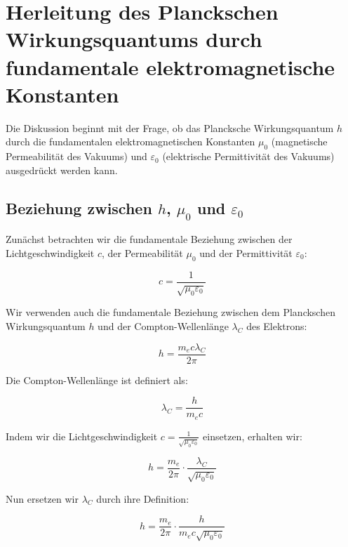 \documentclass{article}
\begin{document}
	\section{Herleitung des Planckschen Wirkungsquantums durch fundamentale elektromagnetische Konstanten}
	
	Die Diskussion beginnt mit der Frage, ob das Plancksche Wirkungsquantum $h$ durch die fundamentalen elektromagnetischen Konstanten $\mu_0$ (magnetische Permeabilität des Vakuums) und $\varepsilon_0$ (elektrische Permittivität des Vakuums) ausgedrückt werden kann.
	
	\subsection{Beziehung zwischen $h$, $\mu_0$ und $\varepsilon_0$}
	
	Zunächst betrachten wir die fundamentale Beziehung zwischen der Lichtgeschwindigkeit $c$, der Permeabilität $\mu_0$ und der Permittivität $\varepsilon_0$:
	
	\begin{equation}
		c = \frac{1}{\sqrt{\mu_0\varepsilon_0}}
	\end{equation}
	
	Wir verwenden auch die fundamentale Beziehung zwischen dem Planckschen Wirkungsquantum $h$ und der Compton-Wellenlänge $\lambda_C$ des Elektrons:
	
	\begin{equation}
		h = \frac{m_e c \lambda_C}{2\pi}
	\end{equation}
	
	Die Compton-Wellenlänge ist definiert als:
	
	\begin{equation}
		\lambda_C = \frac{h}{m_e c}
	\end{equation}
	
	Indem wir die Lichtgeschwindigkeit $c = \frac{1}{\sqrt{\mu_0\varepsilon_0}}$ einsetzen, erhalten wir:
	
	\begin{equation}
		h = \frac{m_e}{2\pi} \cdot \frac{\lambda_C}{\sqrt{\mu_0\varepsilon_0}}
	\end{equation}
	
	Nun ersetzen wir $\lambda_C$ durch ihre Definition:
	
	\begin{equation}
		h = \frac{m_e}{2\pi} \cdot \frac{h}{m_e c \sqrt{\mu_0\varepsilon_0}}
	\end{equation}
	
\end{document}
